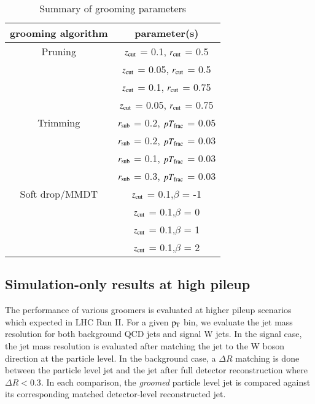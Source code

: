  
\begin{table}[h]
\begin{center}
\begin{tabular}{|c|c|}
    \hline
    grooming algorithm & parameter(s) \\
    \hline
    \hline    
    {Pruning} & $z_{\rm cut}$ = 0.1, $r_{\rm cut}$ = 0.5\\
    & $z_{\rm cut}$ = 0.05, $r_{\rm cut}$ = 0.5\\
    & $z_{\rm cut}$ = 0.1, $r_{\rm cut}$ = 0.75\\
    & $z_{\rm cut}$ = 0.05, $r_{\rm cut}$ = 0.75\\        
    \hline
    {Trimming} & $r_{\rm sub}$ = 0.2, $pT_{\rm frac}$ = 0.05\\
    & $r_{\rm sub}$ = 0.2, $pT_{\rm frac}$ = 0.03\\    
    & $r_{\rm sub}$ = 0.1, $pT_{\rm frac}$ = 0.03\\    
    & $r_{\rm sub}$ = 0.3, $pT_{\rm frac}$ = 0.03\\            
    \hline
    {Soft drop/MMDT} & $z_{\rm cut}$ = 0.1,$\beta$  = -1 \\
     & $z_{\rm cut}$ = 0.1,$\beta$  = 0 \\    
     & $z_{\rm cut}$ = 0.1,$\beta$  = 1 \\    
     & $z_{\rm cut}$ = 0.1,$\beta$  = 2 \\              
    \hline    
\end{tabular}
\caption{Summary of grooming parameters}
\label{tab:groom}
\end{center}
\end{table}



\subsection{Simulation-only results at high pileup}


The performance of various groomers is evaluated at higher pileup scenarios which expected in LHC Run II.
For a given $\rm p_{T}$ bin, we evaluate the jet mass resolution for both background QCD jets and signal W jets.  
In the signal case, the jet mass resolution is evaluated after matching the jet to the W boson direction at the particle level.  
In the background case, a $\Delta R$ matching is done between the particle level jet and the jet after full detector reconstruction where $\Delta R < 0.3$.
In each comparison, the {\it groomed} particle level jet is compared against its corresponding matched detector-level reconstructed jet.

